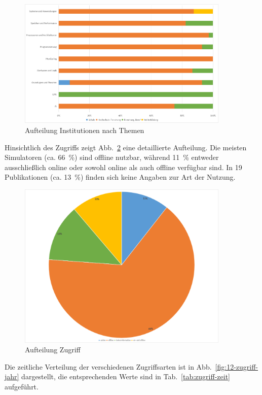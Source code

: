 \begin{figure}[!htbp]
    \centering
    \caption{Aufteilung Institutionen nach Themen}
    \label{fig:10-institution-themen}
    \includegraphics[width=0.90\textwidth]{graphics/10-institution-themen.png}
\end{figure}

Hinsichtlich des Zugriffs zeigt Abb.~\ref{fig:11-zugriff} eine detaillierte Aufteilung. Die meisten Simulatoren (ca. 66~\%) sind offline nutzbar, während 11~\% entweder ausschließlich online oder sowohl online als auch offline verfügbar sind. In 19 Publikationen (ca. 13~\%) finden sich keine Angaben zur Art der Nutzung.

\begin{figure}[!htbp]
    \centering
    \caption{Aufteilung Zugriff}
    \label{fig:11-zugriff}
    \includegraphics[width=0.90\textwidth]{graphics/11-zugriff2.png}
\end{figure}

Die zeitliche Verteilung der verschiedenen Zugriffsarten ist in Abb.~\ref{fig:12-zugriff-jahr} dargestellt, die entsprechenden Werte sind in Tab.~\ref{tab:zugriff-zeit} aufgeführt.

